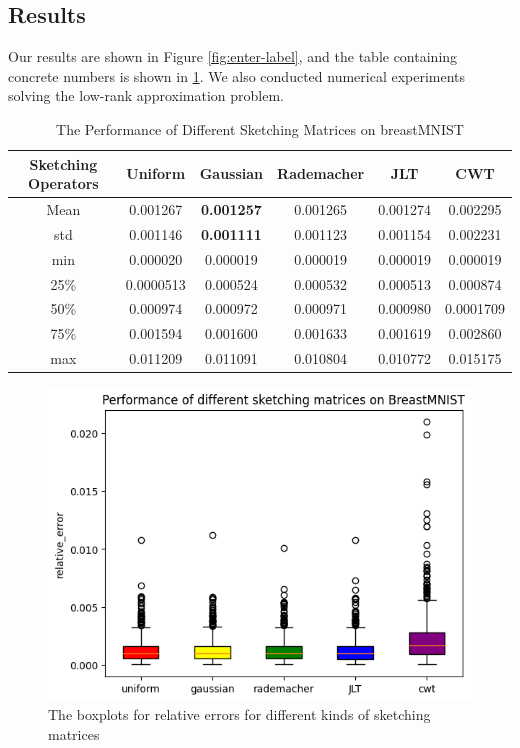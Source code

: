 \documentclass{article}
\begin{document}
\subsection{Results}
Our results are shown in Figure \ref{fig:enter-label}, and the table containing concrete numbers is shown in 
\ref{tab:table for descriptions}. We also conducted numerical experiments solving the low-rank approximation problem.
\begin{table}
    \centering
    \begin{tabular}{cccccc}
      Sketching Operators   &Uniform  &Gaussian  &Rademacher  & JLT & CWT\\
      \hline
       Mean  &0.001267  & \textbf{0.001257} & 0.001265 & 0.001274 &0.002295 \\
       \hline
       std  & 0.001146 & \textbf{0.001111} & 0.001123 & 0.001154 &0.002231 \\
       \hline
        min & 0.000020 & 0.000019 & 0.000019 & 0.000019 &0.000019 \\
        \hline
        25\% & 0.0000513 & 0.000524 & 0.000532 & 0.000513 & 0.000874\\
        \hline
        50\% &0.000974  & 0.000972 & 0.000971 & 0.000980 & 0.0001709\\
        \hline
        75\% &0.001594 & 0.001600 & 0.001633 & 0.001619 & 0.002860\\
        \hline
        max & 0.011209 & 0.011091 & 0.010804 & 0.010772 &0.015175 \\
    \end{tabular}
    \caption{The Performance of Different Sketching Matrices on breastMNIST}
    \label{tab:table for descriptions}
\end{table}
\begin{figure}
    \centering
    \includegraphics[width=0.5\linewidth]{figures/output_for_sketching_matrices.png}
    \caption{The boxplots for relative errors for different kinds of sketching matrices}
    \label{fig:low_rank_results}
\end{figure}
\end{document}
